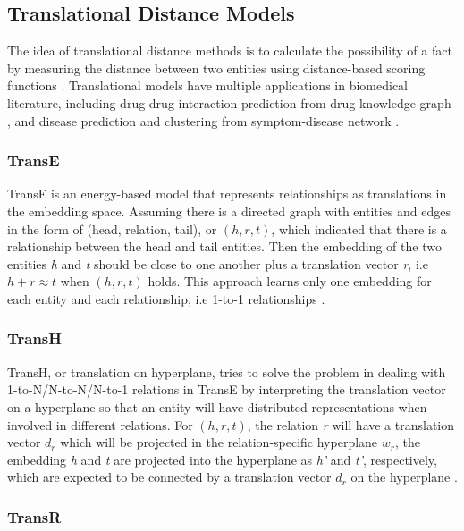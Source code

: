 \subsection{Translational Distance Models}

The idea of translational distance methods is to calculate the possibility of a fact by measuring the distance between two entities using distance-based scoring functions \cite{wang_knowledge_2017}.
Translational models have multiple applications in biomedical literature, including drug-drug interaction prediction from drug knowledge graph \cite{abdelaziz_large-scale_2017, wang_predicting_2017}, and disease prediction and clustering from symptom-disease network \cite{zhao_contextcare:_2017}.

\subsubsection{TransE}

TransE is an energy-based model that represents relationships as translations in the embedding space.
Assuming there is a directed graph with entities and edges in the form of (head, relation, tail), or $(h, r, t)$, which indicated that there is a relationship between the head and tail entities. Then the embedding of the two entities \textit{h} and \textit{t} should be close to one another plus a translation vector \textit{r}, i.e $h + r \approx t$ when $(h, r, t)$ holds. This approach learns only one embedding for each entity and each relationship, i.e 1-to-1 relationships \cite{bordes_translating_2013}.

\subsubsection{TransH}
TransH, or translation on hyperplane, tries to solve the problem in dealing with 1-to-N/N-to-N/N-to-1 relations in TransE by interpreting the translation vector on a hyperplane so that an entity will have distributed representations when involved in different relations.
For $(h, r, t)$, the relation \textit{r} will have a translation vector $d_{r}$ which will be projected in the relation-specific hyperplane $w_{r}$, the embedding \textit{h} and \textit{t} are projected into the hyperplane as \textit{h’} and \textit{t’}, respectively, which are expected to be connected by a translation vector $d_{r}$ on the hyperplane \cite{wang_knowledge_2014}. 

\subsubsection{TransR}

